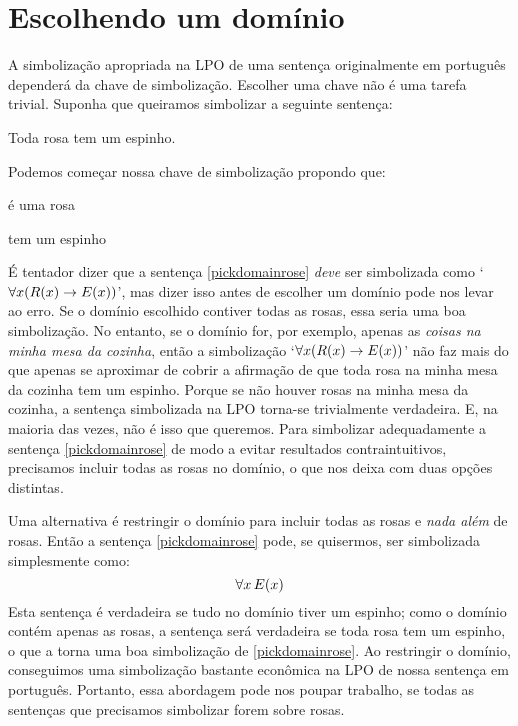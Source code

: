 \section{Escolhendo um domínio}
A simbolização apropriada na LPO de uma sentença originalmente em português dependerá da chave de simbolização.
Escolher uma chave não é uma tarefa trivial.
Suponha que queiramos simbolizar a seguinte sentença:
	\begin{earg}
		\item[\ex{pickdomainrose}] Toda rosa tem um espinho.
	\end{earg}
Podemos começar nossa chave de simbolização propondo que:
	\begin{ekey}
		\item[\atom{R}{x}]  é uma rosa
		\item[\atom{E}{x}]  tem um espinho
	\end{ekey}
É tentador dizer que a sentença \ref{pickdomainrose} \emph{deve} ser simbolizada como `$\forall x(\mathord{R}(x) \rightarrow \mathord{E}(x))$', mas dizer isso antes de escolher um domínio pode nos levar ao erro.
Se o domínio escolhido contiver todas as rosas, essa seria uma boa simbolização. No entanto, se o domínio for, por exemplo, apenas as \emph{coisas na minha mesa da cozinha}, então a simbolização `$\forall x(\mathord{R}(x) \rightarrow \mathord{E}(x))$' não faz mais do que apenas se aproximar de cobrir a afirmação de que toda rosa na minha mesa da cozinha tem um espinho.
Porque se não houver rosas na minha mesa da cozinha, a sentença simbolizada na LPO torna-se trivialmente verdadeira.
E, na maioria das vezes, não é isso que queremos.
Para simbolizar adequadamente a sentença \ref{pickdomainrose} de modo a evitar resultados contraintuitivos, precisamos incluir todas as rosas no domínio, o que nos deixa com duas opções distintas. 

Uma alternativa é restringir o domínio para incluir todas as rosas e \emph{nada além} de rosas.
Então a sentença \ref{pickdomainrose} pode, se quisermos, ser simbolizada simplesmente como:
$$\forall x\,\mathord{E}(x)$$
Esta sentença é verdadeira se tudo no domínio tiver um espinho; como o domínio contém apenas as rosas, a sentença será verdadeira se toda rosa tem um espinho, o que a torna uma boa simbolização de \ref{pickdomainrose}.
Ao restringir o domínio, conseguimos uma simbolização bastante econômica na LPO de nossa sentença em português.
Portanto, essa abordagem pode nos poupar trabalho, se todas as sentenças que precisamos simbolizar forem sobre rosas.

